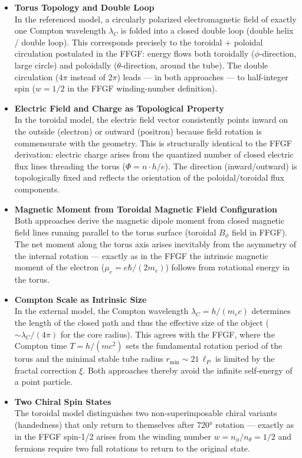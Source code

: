 \begin{itemize}
	\item \textbf{Torus Topology and Double Loop}\\
	In the referenced model, a circularly polarized electromagnetic field of exactly one Compton wavelength $\lambda_C$ is folded into a closed double loop (double helix / double loop). This corresponds precisely to the toroidal + poloidal circulation postulated in the FFGF: energy flows both toroidally ($\phi$-direction, large circle) and poloidally ($\theta$-direction, around the tube). The double circulation (4$\pi$ instead of 2$\pi$) leads — in both approaches — to half-integer spin ($w = 1/2$ in the FFGF winding-number definition).
	
	\item \textbf{Electric Field and Charge as Topological Property}\\
	In the toroidal model, the electric field vector consistently points inward on the outside (electron) or outward (positron) because field rotation is commensurate with the geometry. This is structurally identical to the FFGF derivation: electric charge arises from the quantized number of closed electric flux lines threading the torus ($\Phi = n \cdot h/e$). The direction (inward/outward) is topologically fixed and reflects the orientation of the poloidal/toroidal flux components.
	
	\item \textbf{Magnetic Moment from Toroidal Magnetic Field Configuration}\\
	Both approaches derive the magnetic dipole moment from closed magnetic field lines running parallel to the torus surface (toroidal $B_\phi$ field in FFGF). The net moment along the torus axis arises inevitably from the asymmetry of the internal rotation — exactly as in the FFGF the intrinsic magnetic moment of the electron ($\mu_e = e\hbar / (2m_e)$) follows from rotational energy in the torus.
	
	\item \textbf{Compton Scale as Intrinsic Size}\\
	In the external model, the Compton wavelength $\lambda_C = h/(m_ec)$ determines the length of the closed path and thus the effective size of the object ($\sim \lambda_C / (4\pi)$ for the core radius). This agrees with the FFGF, where the Compton time $T = h/(m c^2)$ sets the fundamental rotation period of the torus and the minimal stable tube radius $r_{\min} \sim 21\,\ell_P$ is limited by the fractal correction $\xi$. Both approaches thereby avoid the infinite self-energy of a point particle.
	
	\item \textbf{Two Chiral Spin States}\\
	The toroidal model distinguishes two non-superimposable chiral variants (handedness) that only return to themselves after 720° rotation — exactly as in the FFGF spin-1/2 arises from the winding number $w = n_\phi / n_\theta = 1/2$ and fermions require two full rotations to return to the original state.
\end{itemize}

